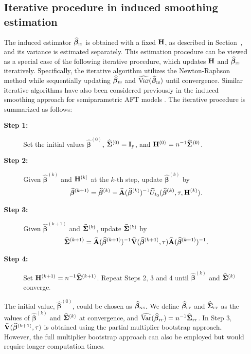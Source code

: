 \subsection{Iterative procedure in induced smoothing estimation} \label{sec:iter}

The induced estimator $\widehat{\bm{\beta}}_{\tiny\mbox{IS}}$ is obtained with a fixed $\mathbf{H}$, 
as described in Section~, and its variance is estimated separately. 
This estimation procedure can be viewed as a special case of the following iterative procedure, 
which updates $\mathbf{H}$ and $\widehat{\bm{\beta}}_{\tiny\mbox{IS}}$ iteratively. 
Specifically, the iterative algorithm utilizes the Newton-Raphson method while sequentially updating $\widehat{\bm{\beta}}_{\tiny\mbox{IS}}$ 
and $\widehat{\mathop{\rm Var}\nolimits}(\widehat{\bm{\beta}}_{\tiny\mbox{IS}})$ until convergence. 
Similar iterative algorithms have also been considered previously in the induced smoothing approach 
for semiparametric AFT models \citep{johnson2009induced, chiou2014fast, chiou2015semiparametric, choi2018smoothed}.
The iterative procedure is summarized as follows:
\begin{description}
\item[\bf Step 1:]
  Set the initial values $\widehat{\bm{\beta}}^{(0)}$, 
  $\widehat{\mathbf{\Sigma}}^{(0)} = \mathbf{I}_{p}$, 
  and $\mathbf{H}^{(0)} = n^{-1}\widehat{\mathbf{\Sigma}}^{(0)}$.
\item[\bf Step 2:]
	Given $\widehat{\bm{\beta}}^{(k)}$ and $\mathbf{H}^{(k)}$ at the $k$-th step, update $\widehat{\bm{\beta}}^{(k)}$ by
	\begin{equation*}
    \widehat{\bm{\beta}}^{(k+1)}=\widehat{\bm{\beta}}^{(k)} - \widehat{\mathbf{A}}(\widehat{\bm{\beta}}^{(k)})^{-1}{\widetilde{U}_{t_0}(\widehat{\bm{\beta}}^{(k)}, \tau, \mathbf{H}^{(k)}}).
  \end{equation*}
\item[\bf Step 3:]
	Given $\widehat{\bm{\beta}}^{(k+1)}$ and $\widehat{\mathbf{\Sigma}}^{(k)}$, update $\widehat{\mathbf{\Sigma}}^{(k)}$ by
	\begin{equation*}
    \widehat{\mathbf{\Sigma}}^{(k+1)} = \widehat{\mathbf{A}}(\widehat{\bm{\beta}}^{(k+1)})^{-1} \widehat{\mathbf{V}}(\widehat{\bm{\beta}}^{(k+1)}, \tau) \widehat{\mathbf{A}}(\widehat{\bm{\beta}}^{(k+1)})^{-1}.
  \end{equation*}
\item[\bf Step 4:]
	Set $\mathbf{H}^{(k+1)} = n^{-1}\widehat{\mathbf{\Sigma}}^{(k+1)}$. Repeat Steps 2, 3 and 4 until $\widehat{\bm{\beta}}^{(k)}$ and $\widehat{\mathbf{\Sigma}}^{(k)}$ converge.
\end{description}
The initial value, $\widehat{\bm{\beta}}^{(0)}$, could be chosen as $\widehat{\bm{\beta}}_{\tiny\mbox{NS}}$.
We define $\widehat{\bm{\beta}}_{\tiny\mbox{IT}}$ and $\widehat{\bm{\Sigma}}_{\tiny\mbox{IT}}$ as the 
values of $\widehat{\bm{\beta}}^{(k)}$ and $\widehat{\mathbf{\Sigma}}^{(k)}$ at convergence, 
and $\widehat{\mathop{\rm Var}\nolimits}(\widehat{\bm{\beta}}_{\tiny\mbox{IT}}) = n^{-1}\widehat{\mathbf{\Sigma}}_{\tiny\mbox{IT}}$.
In Step 3, $\widehat{\mathbf{V}}(\widehat{\bm{\beta}}^{(k+1)}, \tau)$
is obtained using the partial multiplier bootstrap approach. 
However, the full multiplier bootstrap approach can also be employed
but would require longer computation times.

